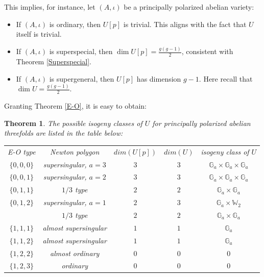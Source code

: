 \documentclass[a4paper,12pt,twoside]{report}
\newtheorem{theorem}{Theorem}[section]
\newcommand{\G}{\mathbb{G}}
\newcommand{\W}{\mathbb{W}}
\begin{document}
This implies, for instance, let $(A,\iota)$ be a principally polarized abelian variety: 
\begin{itemize}
    \item If $(A,\iota)$ is ordinary, then $U[p]$ is trivial. This aligns with the fact that $U$ itself is trivial.
    \item If $(A,\iota)$ is superspecial, then $\dim U[p]=\frac{g(g-1)}{2}$, consistent with Theorem \ref{Superspecial}. 
    \item If $(A,\iota)$ is supergeneral, then $U[p]$ has dimension $g-1$. Here recall that $\dim U=\frac{g(g-1)}{2}$. 
\end{itemize}

Granting Theorem \ref{E-O}, it is easy to obtain: 

\begin{theorem}
    The possible isogeny classes of $U$ for principally polarized abelian threefolds are listed in the table below:
\begin{center}{\rm\label{abe3table}
    \begin{tabular}{ c|c|c|c|c } \label{Table2}
     E-O type             & Newton polygon                                                  & $dim(U[p])$& $dim(U)$ & isogeny class of $U$\\ 
     $\{0,0,0\}$          &   supersingular, $a=3$                                          &  $3$       & $3$     & $\G_a\times \G_a\times \G_a$  \\ 
     $\{0,0,1\}$          &   supersingular, $a=2$                                          &  $3$       & $3$     & $\G_a\times \G_a\times \G_a$\\           
     $\{0,1,1\}$          &   $1/3$ type                                                    &  $2$       & $2$     & $\G_a\times \G_a$  \\ 
     $\{0,1,2\}$          &   supersingular, $a=1$                                          &  $2$       & $3$     & $\G_a\times \W_2$\\     
                          &   $1/3$ type                                                    &  $2$       & $2$     & $\G_a\times \G_a$\\                 
     $\{1,1,1\}$          &   almost supersingular                                          &  $1$       & $1$     & $\G_a$  \\ 
     $\{1,1,2\}$          &   almost supersingular                                          &  $1$       & $1$     & $\G_a$\\           
     $\{1,2,2\}$          &   almost ordinary                                               &  $0$       & $0$     & $0$  \\ 
     $\{1,2,3\}$          &   ordinary                                                      &  $0$       & $0$     & $0$\\           
    \end{tabular}}
\end{center}
\end{theorem}
\end{document}
